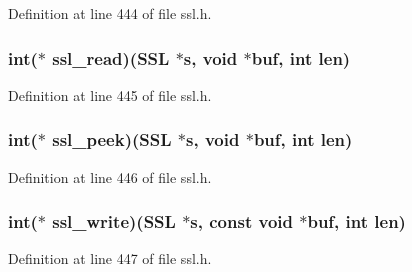 Definition at line 444 of file ssl.\+h.

\subsubsection[{\texorpdfstring{ssl\+\_\+read}{ssl_read}}]{\setlength{\rightskip}{0pt plus 5cm}int($\ast$ ssl\+\_\+read)({\bf S\+SL} $\ast$s, {\bf void} $\ast$buf, int {\bf len})}\hypertarget{structssl__method__st_a08b6155a38ff9a92d129ee5714fcc106}{}\label{structssl__method__st_a08b6155a38ff9a92d129ee5714fcc106}


Definition at line 445 of file ssl.\+h.

\subsubsection[{\texorpdfstring{ssl\+\_\+peek}{ssl_peek}}]{\setlength{\rightskip}{0pt plus 5cm}int($\ast$ ssl\+\_\+peek)({\bf S\+SL} $\ast$s, {\bf void} $\ast$buf, int {\bf len})}\hypertarget{structssl__method__st_ae0f55e38529bb5894dcec9ff19e9b04d}{}\label{structssl__method__st_ae0f55e38529bb5894dcec9ff19e9b04d}


Definition at line 446 of file ssl.\+h.

\subsubsection[{\texorpdfstring{ssl\+\_\+write}{ssl_write}}]{\setlength{\rightskip}{0pt plus 5cm}int($\ast$ ssl\+\_\+write)({\bf S\+SL} $\ast$s, const {\bf void} $\ast$buf, int {\bf len})}\hypertarget{structssl__method__st_a7d53f3c773121d96d1653052bf263f84}{}\label{structssl__method__st_a7d53f3c773121d96d1653052bf263f84}


Definition at line 447 of file ssl.\+h.

